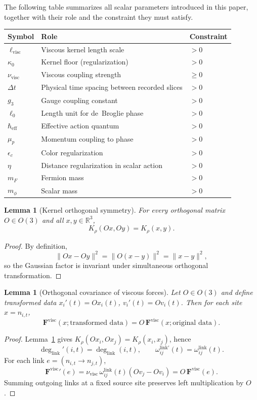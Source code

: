\documentclass[11pt]{article}
\newtheorem{lemma}[theorem]{Lemma}
\theoremstyle{remark}
\newcommand{\R}{\mathbb R}
\begin{document}
The following table summarizes all scalar parameters introduced in this paper,
together with their role and the constraint they must satisfy.

\begin{center}
\begin{tabular}{@{}lll@{}}
\toprule
Symbol & Role & Constraint \\
\midrule
$\ell_{\mathrm{visc}}$ & Viscous kernel length scale & $>0$ \\
$\kappa_0$ & Kernel floor (regularization) & $>0$ \\
$\nu_{\mathrm{visc}}$ & Viscous coupling strength & $\ge0$ \\
$\Delta t$ & Physical time spacing between recorded slices & $>0$ \\
$g_3$ & Gauge coupling constant & $>0$ \\
$\ell_0$ & Length unit for de~Broglie phase & $>0$ \\
$\hbar_{\mathrm{eff}}$ & Effective action quantum & $>0$ \\
$\mu_p$ & Momentum coupling to phase & $>0$ \\
$\epsilon_c$ & Color regularization & $>0$ \\
$\eta$ & Distance regularization in scalar action & $>0$ \\
$m_F$ & Fermion mass & $>0$ \\
$m_\phi$ & Scalar mass & $>0$ \\
\bottomrule
\end{tabular}
\end{center}

\begin{lemma}[Kernel orthogonal symmetry]
\label{lem:kernel-orth}
For every orthogonal matrix $O\in O(3)$ and all $x,y\in\R^3$,
\[
K_\rho(Ox,Oy)=K_\rho(x,y).
\]
\end{lemma}
\begin{proof}
By definition,
\[
\|Ox-Oy\|^2=\|O(x-y)\|^2=\|x-y\|^2,
\]
so the Gaussian factor is invariant under simultaneous orthogonal transformation.
\end{proof}

\begin{lemma}[Orthogonal covariance of viscous forces]
\label{lem:orthogonal}
Let $O\in O(3)$ and define transformed data $x_i'(t)=Ox_i(t)$, $v_i'(t)=Ov_i(t)$.
Then for each site $x=n_{i,t}$,
\[
\mathbf F^{\mathrm{visc}}(x;\text{transformed data})=O\,\mathbf F^{\mathrm{visc}}(x;\text{original data}).
\]
\end{lemma}
\begin{proof}
Lemma~\ref{lem:kernel-orth} gives $K_\rho(Ox_i,Ox_j)=K_\rho(x_i,x_j)$, hence
\[
\deg_{\mathrm{link}}'(i,t)=\deg_{\mathrm{link}}(i,t),
\qquad
\omega_{ij}^{\mathrm{link}\prime}(t)=\omega_{ij}^{\mathrm{link}}(t).
\]
For each link $e=(n_{i,t}\to n_{j,t})$,
\[
\mathbf F^{\mathrm{visc}}{}'(e)
=\nu_{\mathrm{visc}}\,\omega^{\mathrm{link}}_{ij}(t)(Ov_j-Ov_i)
=O\,\mathbf F^{\mathrm{visc}}(e).
\]
Summing outgoing links at a fixed source site preserves left multiplication by $O$.
\end{proof}
\end{document}
